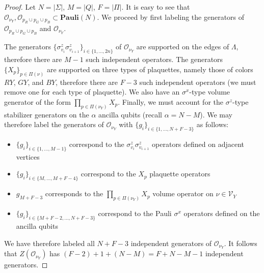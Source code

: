\documentclass[12pt]{article}
\theoremstyle{definition}
\begin{document}
    \begin{proof}
        Let $N = |\Sigma|$, $M = |Q|$, $F = |\Pi|$. It is easy to see that $\mathcal{O}_{\nu_Y},\mathcal{O}_{p_R\cup p_G\cup p_B}\subset\textbf{Pauli}(N)$. We proceed by first labeling the generators of $\mathcal{O}_{p_R\cup p_G\cup p_B}$ and $\mathcal{O}_{\nu_Y}$.\newline

        The generators $\{\sigma^z_{v_i}\sigma^z_{v_{i+1}}\}_{i\in\{1,...,2n\}}$ of $\mathcal{O}_{\nu_Y}$ are supported on the edges of $\Lambda$, therefore there are $M - 1$ such independent operators. The generators $\{X_p\}_{p\in\Pi(\nu)}$  are supported on three types of plaquettes, namely those of colors $RY$, $GY$, and $BY$, therefore there are $F-3$ such independent operators (we must remove one for each type of plaquette). We also have an $\sigma^x$-type volume generator of the form $\prod_{p\in\Pi(\nu_Y)}X_p$. Finally, we must account for the $\sigma^z$-type stabilizer generators on the $\alpha$ ancilla qubits (recall $\alpha = N - M$). We may therefore label the generators of $\mathcal{O}_{\nu_Y}$ with $\{g_i\}_{i\in\{1,...,N+F-3\}}$ as follows:
            \begin{itemize}
                \item $\{g_i\}_{i\in\{1,...,M-1\}}$ correspond to the $\sigma^z_{v_i}\sigma^z_{v_{i+1}}$ operators defined on adjacent vertices
                \item $\{g_i\}_{i\in\{M,...,M+F-4\}}$ correspond to the $X_p$ plaquette operators
                \item $g_{M+F-3}$ corresponds to the $\prod_{p\in\Pi(\nu_Y)}X_p$ volume operator on $\nu\in\mathcal{V}_Y$
                \item $\{g_i\}_{i\in\{M+F-2,...,N+F-3\}}$ correspond to the Pauli $\sigma^x$ operators defined on the ancilla qubits
            \end{itemize}
        We have therefore labeled all $N+F-3$ independent generators of $\mathcal{O}_{\nu_Y}$. It follows that $Z(\mathcal{O}_{\nu_Y})$ has $(F-2)+1+(N-M) = F+N-M-1$ independent generators.


\end{proof}
\end{document}
